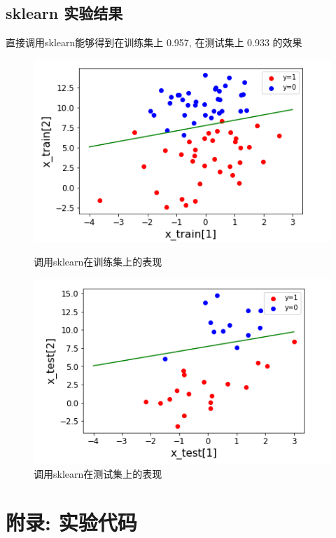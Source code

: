 \documentclass[UTF8]{article}
\begin{document}
\subsection{sklearn 实验结果}
\noindent 直接调用sklearn能够得到在训练集上 0.957, 在测试集上 0.933 的效果
\begin{figure}[H]
	\begin{minipage}[H]{0.5\linewidth}
		\centering
		\includegraphics[width=\linewidth]{sklearn_train.png}
		\caption{调用sklearn在训练集上的表现}
	\end{minipage}
	\begin{minipage}[H]{0.5\linewidth}
		\centering
		\includegraphics[width=\linewidth]{sklearn_test.png}
		\caption{调用sklearn在测试集上的表现}
	\end{minipage}
\end{figure}

\newpage
\section{附录: 实验代码}
\end{document}
